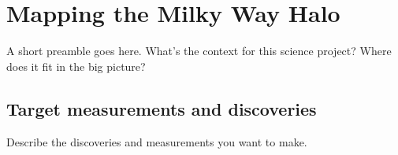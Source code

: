 %
%
%
%
%
%
%

\section{Mapping the Milky Way Halo}
\def\secname{MW_Halo}\label{sec:\secname} %



A short preamble goes here. What's the context for this science
project? Where does it fit in the big picture?


\subsection{Target measurements and discoveries}
\label{sec:keyword:MW_Halo_targets}

Describe the discoveries and measurements you want to make.

